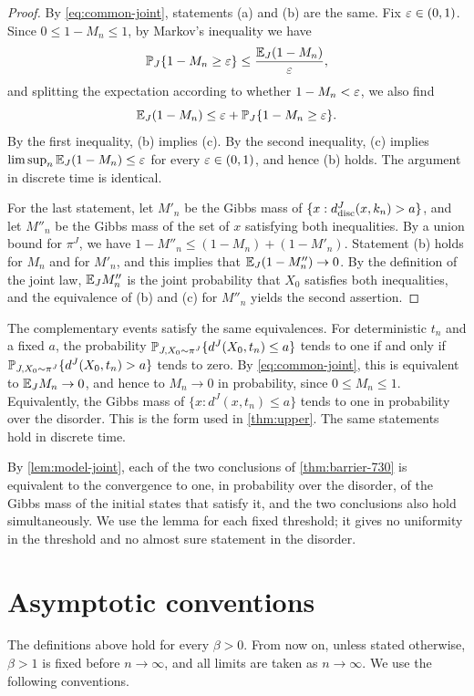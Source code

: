 \begin{proof}
By \eqref{eq:common-joint}, statements (a) and (b) are the same. Fix $\varepsilon\in(0,1)$. Since $0\le1-M_n\le1$, by Markov's inequality we have
\[
 \mathbb P_J\{1-M_n\ge\varepsilon\}\le\frac{\mathbb E_J(1-M_n)}{\varepsilon},
\]
and splitting the expectation according to whether $1-M_n<\varepsilon$, we also find
\[
 \mathbb E_J(1-M_n)\le\varepsilon+\mathbb P_J\{1-M_n\ge\varepsilon\}.
\]
By the first inequality, (b) implies (c). By the second inequality, (c) implies $\limsup_n\mathbb E_J(1-M_n)\le\varepsilon$ for every $\varepsilon\in(0,1)$, and hence (b) holds. The argument in discrete time is identical.

For the last statement, let $M'_n$ be the Gibbs mass of $\{x:d^J_{\rm disc}(x,k_n)>a\}$, and let $M''_n$ be the Gibbs mass of the set of $x$ satisfying both inequalities. By a union bound for $\pi^J$, we have $1-M''_n\le(1-M_n)+(1-M'_n)$. Statement (b) holds for $M_n$ and for $M'_n$, and this implies that $\mathbb E_J(1-M''_n)\to0$. By the definition of the joint law, $\mathbb E_JM''_n$ is the joint probability that $X_0$ satisfies both inequalities, and the equivalence of (b) and (c) for $M''_n$ yields the second assertion.
\end{proof}

The complementary events satisfy the same equivalences. For deterministic
$t_n$ and a fixed $a$, the probability
$\mathbb P_{J,X_0\sim\pi^J}\{d^J(X_0,t_n)\le a\}$ tends to one if and only if
$\mathbb P_{J,X_0\sim\pi^J}\{d^J(X_0,t_n)>a\}$ tends to zero. By
\eqref{eq:common-joint}, this is equivalent to $\mathbb E_JM_n\to0$, and hence to
$M_n\to0$ in probability, since $0\le M_n\le1$. Equivalently, the Gibbs
mass of $\{x:d^J(x,t_n)\le a\}$ tends to one in probability over the disorder.
This is the form used in \cref{thm:upper}. The same statements hold in
discrete time.

By \cref{lem:model-joint}, each of the two conclusions of \cref{thm:barrier-730} is equivalent to the convergence to one, in probability over the disorder, of the Gibbs mass of the initial states that satisfy it, and the two conclusions also hold simultaneously. We use the lemma for each fixed threshold; it gives no uniformity in the threshold and no almost sure statement in the disorder.

\section{Asymptotic conventions}\label{sec:model-asymptotics}

The definitions above hold for every $\beta>0$. From now on, unless stated otherwise, $\beta>1$ is fixed before $n\to\infty$, and all limits are taken as $n\to\infty$. We use the following conventions.

